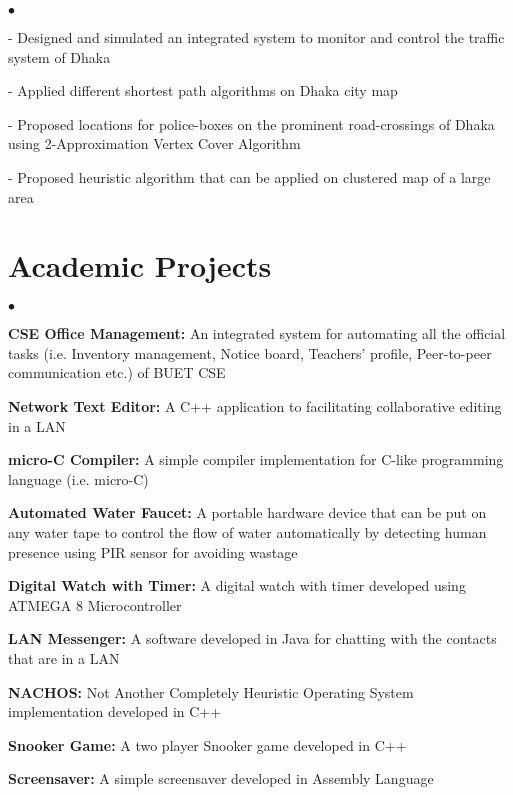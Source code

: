 \documentclass[margin,line]{res}
\newenvironment{list2}{
  \begin{list}{$\bullet$}{%
      \setlength{\itemsep}{0in}
      \setlength{\parsep}{0in} \setlength{\parskip}{0in}
      \setlength{\topsep}{0in} \setlength{\partopsep}{0in} 
      \setlength{\leftmargin}{0.2in}}}{\end{list}}
\begin{document}
\begin{resume}
\begin{list2}
\item[ - ] Designed and simulated an integrated system to monitor and control the traffic system of Dhaka
\item[ - ] Applied different shortest path algorithms on Dhaka city map
\item[ - ] Proposed locations for police-boxes on the prominent road-crossings of Dhaka using 2-Approximation Vertex Cover Algorithm
\item[ - ] Proposed heuristic algorithm that can be applied on clustered map of a large area
\end{list2}
\vspace*{-.1in}

\section{\sc Academic Projects}
\begin{list2}
\item {\bf CSE Office Management:} An integrated system for automating all the official tasks (i.e. Inventory management, Notice board, Teachers' profile, Peer-to-peer communication etc.) of BUET CSE
\item {\bf Network Text Editor:} A C++ application to facilitating collaborative editing in a LAN
\item {\bf micro-C Compiler:} A simple compiler implementation for C-like programming language (i.e. micro-C)
\item {\bf Automated Water Faucet:} A portable hardware device that can be put on any water tape to control the flow of water automatically by detecting human presence using PIR sensor for avoiding wastage
\item {\bf Digital Watch with Timer:} A digital watch with timer developed using ATMEGA 8 Microcontroller
\item {\bf LAN Messenger:} A software developed in Java for chatting with the contacts that are in a LAN
\item {\bf NACHOS:} Not Another Completely Heuristic Operating System implementation developed in C++
\item {\bf Snooker Game:} A two player Snooker game developed in C++
\item {\bf Screensaver:} A simple screensaver developed in Assembly Language
\end{list2}

\vspace*{-.1in}


\end{resume}
\end{document}
